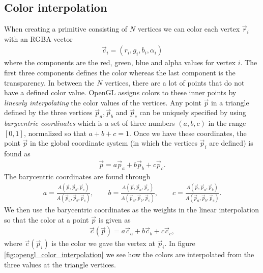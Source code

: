 \subsection{Color interpolation}
When creating a primitive consisting of $N$ vertices we can color each vertex $\vec r_i$ with an RGBA vector
\begin{align}
	\vec c_i = (r_i, g_i, b_i, \alpha_i)
\end{align}
where the components are the red, green, blue and alpha values for vertex $i$. The first three components defines the color whereas the last component is the transparency. In between the $N$ vertices, there are a lot of points that do not have a defined color value. OpenGL assigns colors to these inner points by \textit{linearly interpolating} the color values of the vertices. Any point $\vec p$ in a triangle defined by the three vertices $\vec p_a, \vec p_b$ and $\vec p_c$ can be uniquely specified by using \textit{barycentric coordinates} which is a set of three numbers $(a,b,c)$ in the range $[0,1]$, normalized so that $a+b+c=1$.  Once we have these coordinates, the point $\vec p$ in the global coordinate system (in which the vertices $\vec p_i$ are defined) is found as
\begin{align}
	\vec p = a\vec p_a + b\vec p_b + c\vec p_c.
\end{align}
The barycentric coordinates are found through
\begin{align}
	a = \frac{A(\vec p, \vec p_b, \vec p_c)}{A(\vec p_a, \vec p_b, \vec p_c)}, \qquad b = \frac{A(\vec p, \vec p_a, \vec p_c)}{A(\vec p_a, \vec p_b, \vec p_c)}, \qquad c = \frac{A(\vec p, \vec p_a, \vec p_b)}{A(\vec p_a, \vec p_b, \vec p_c)}.
\end{align}
We then use the barycentric coordinates as the weights in the linear interpolation so that the color at a point $\vec p$ is given as
\begin{align}
	\vec c(\vec p) = a\vec c_a + b\vec c_b + c\vec c_c,
\end{align}
where $\vec c(\vec p_i)$ is the color we gave the vertex at $\vec p_i$. In figure \ref{fig:opengl_color_interpolation} we see how the colors are interpolated from the three values at the triangle vertices.
